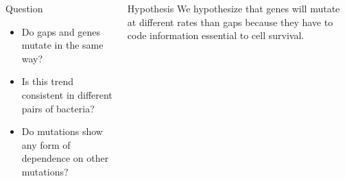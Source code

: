 \documentclass[final]{beamer}
\begin{document}
\begin{frame}{}
\begin{columns}[t]
\begin{column}{.32 \linewidth}
			\begin{block}{\large Question}
				\begin{itemize}
					\item Do gaps and genes mutate in the same way?
					\item Is this trend consistent in different pairs of bacteria?
					\item Do mutations show any form of dependence on other mutations?
				\end{itemize} 
			\end{block}
			
			
			
		\end{column}
		
		
		\begin{column}{.32 \linewidth}
			\begin{block}{\large Hypothesis}
				We hypothesize that genes will mutate at different rates than gaps because they have to code information essential to cell survival.
				

\end{block}
\end{column}
\end{columns}
\end{frame}
\end{document}
